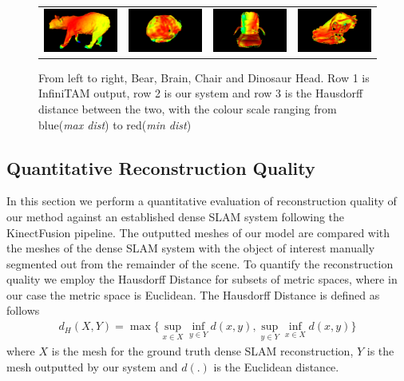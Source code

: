 \begin{figure}[!t]
\begin{tabular}{cccc}
		\includegraphics[width=3cm]{hausdorff/bear.png}&
		\includegraphics[width=3cm]{hausdorff/brain.png}&
		\includegraphics[width=3cm]{hausdorff/chair.png}&
		\includegraphics[width=3cm]{hausdorff/dino.png}\\
	\end{tabular}
	\vspace{-3mm}
	\caption{
		From left to right, Bear, Brain, Chair and Dinosaur Head. Row 1 is InfiniTAM output, row 2 is our system and row 3 is the Hausdorff distance between the two, with the colour scale ranging from blue(\textit{max dist}) to red(\textit{min dist})
	}
		\vspace{-5mm}
	\label{fig:demo}
\end{figure}


\subsection{Quantitative Reconstruction Quality}
In this section we perform a quantitative evaluation of reconstruction quality of our method against an established dense SLAM system \cite{Prisacariu2014} following the KinectFusion \cite{Newcombe2011} pipeline.
The outputted meshes of our model are compared with the meshes of the dense SLAM system with the object of interest manually segmented out from the remainder of the scene. To quantify the reconstruction quality 
we employ the Hausdorff Distance for subsets of metric spaces, where in our case the metric space is Euclidean. The Hausdorff Distance is defined as follows
\begin{equation}
\begin{split}
d_{H}(X, Y) = \max \Bigg \{ \sup_{x \in X} \inf_{y \in Y} d(x, y), \sup_{y \in Y} \inf_{x \in X} d(x, y) \Bigg \}
\end{split}
\end{equation}
where $X$ is the mesh for the ground truth dense SLAM reconstruction, $Y$ is the mesh outputted by our system and $d(.)$ is the Euclidean distance.

